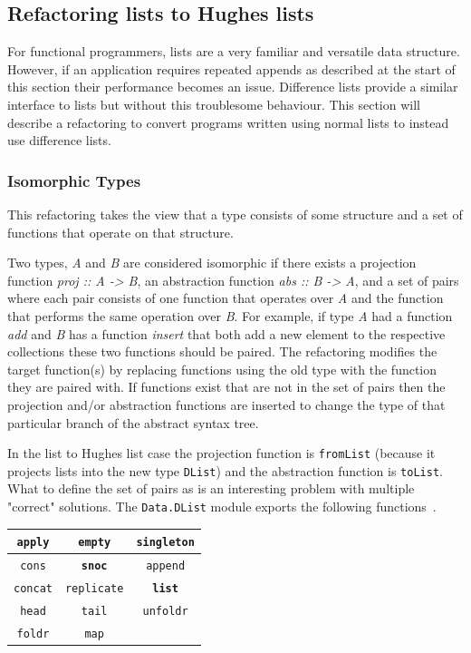 \subsection{Refactoring lists to Hughes lists}

For functional programmers, lists are a very familiar and versatile data structure. However, if an application requires repeated appends as described at the start of this section their performance becomes an issue. Difference lists provide a similar interface to lists but without this troublesome behaviour. This section will describe a refactoring to convert programs written using normal lists to instead use difference lists. 

\subsubsection{Isomorphic Types} 
This refactoring takes the view that a type consists of some structure and a set of functions that operate on that structure. 

Two types, \textit{A} and \textit{B} are considered isomorphic if there exists a projection function \textit{proj :: A -> B}, an abstraction function \textit{abs :: B -> A}, and a set of pairs where each pair consists of one function that operates over \textit{A} and the function that performs the same operation over \textit{B}. For example, if type \textit{A} had a function \textit{add} and \textit{B} has a function \textit{insert} that both add a new element to the respective collections these two functions should be paired. The refactoring modifies the target function(s) by replacing functions using the old type with the function they are paired with. If functions exist that are not in the set of pairs then the projection and/or abstraction functions are inserted to change the type of that particular branch of the abstract syntax tree.

In the list to Hughes list case the projection function is \texttt{fromList} (because it projects lists into the new type \texttt{DList}) and the abstraction function is \texttt{toList}. What to define the set of pairs as is an interesting problem with multiple "correct" solutions. The \texttt{Data.DList} module exports the following functions~\citep{dlist}.

\begin{center}
\begin{tabular}{| c | c | c |}
  \hline
  \texttt{apply} & \texttt{empty} & \texttt{singleton}\\
  \hline
  \texttt{cons} & \textbf{\texttt{snoc}} & \texttt{append} \\
  \hline
  \texttt{concat} & \texttt{replicate} & \textbf{\texttt{list}}\\ 
  \hline	
  \texttt{head} & \texttt{tail} & \texttt{unfoldr}\\ 
  \hline  
  \texttt{foldr} & \texttt{map} \\
  \hline
\end{tabular}
\end{center}


